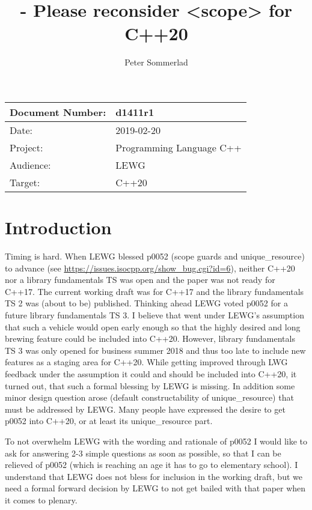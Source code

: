 \documentclass[ebook,11pt,article]{memoir}
\title{\papernumber{} - Please reconsider <scope> for C++20}
\author{Peter Sommerlad}
\date{\paperdate}                %
\newcommand{\papernumber}{d1411r1}
\newcommand{\paperdate}{2019-02-20}
\begin{document}
\maketitle
\begin{center}
\begin{tabular}[t]{|l|l|}\hline 
Document Number:&  \papernumber \hfill \\\hline
Date: & \paperdate \\\hline
Project: & Programming Language C++\\\hline 
Audience: & LEWG\\\hline
Target: & C++20 \\\hline
\end{tabular}
\end{center}
\chapter{Introduction}
Timing is hard. When LEWG blessed p0052 (scope guards and unique_resource) to advance (see \url{https://issues.isocpp.org/show_bug.cgi?id=6}), neither C++20 nor a library fundamentals TS was open and the paper was not ready for C++17. The current working draft was for C++17 and the library fundamentals TS 2 was (about to be) published. Thinking ahead LEWG voted p0052 for a future library fundamentals TS 3. I believe that went under LEWG's assumption that such a vehicle would open early enough so that the highly desired and long brewing feature could be included into C++20. However, library fundamentals TS 3 was only opened for business summer 2018 and thus too late to include new features as a staging area for C++20. While getting improved through LWG feedback under the assumption it could and should be included into C++20, it turned out, that such a formal blessing by LEWG is missing. In addition some minor design question arose (default constructability of unique_resource) that must be addressed by LEWG. Many people have expressed the desire to get p0052 into C++20, or at least its unique_resource part.

To not overwhelm LEWG with the wording and rationale of p0052 I would like to ask for answering 2-3 simple questions as soon as possible, so that I can be relieved of p0052 (which is reaching an age it has to go to elementary school). I understand that LEWG does not bless for inclusion in the working draft, but we need a formal forward decision by LEWG to not get bailed with that paper when it comes to plenary.

\end{document}
